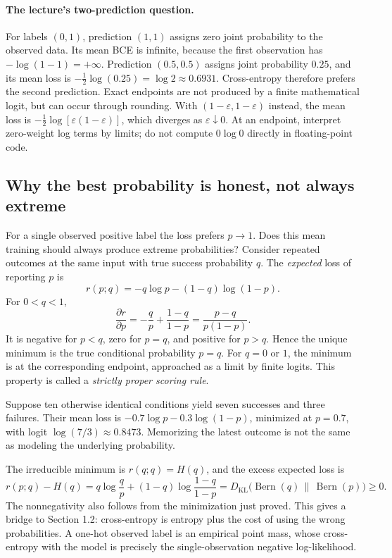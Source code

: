 \paragraph{The lecture's two-prediction question.}
For labels $(0,1)$, prediction $(1,1)$ assigns zero joint probability to the
observed data. Its mean BCE is infinite, because the first observation has
$-\log(1-1)=+\infty$. Prediction $(0.5,0.5)$ assigns joint probability $0.25$,
and its mean loss is $-\tfrac12\log(0.25)=\log2\approx0.6931$.
Cross-entropy therefore prefers the second prediction. Exact endpoints are not
produced by a finite mathematical logit, but can occur through rounding. With
$(1-\varepsilon,1-\varepsilon)$ instead, the mean loss is
$-\tfrac12\log[\varepsilon(1-\varepsilon)]$, which diverges as
$\varepsilon\downarrow0$. At an endpoint, interpret zero-weight log terms by
limits; do not compute $0\log0$ directly in floating-point code.

\subsection{Why the best probability is honest, not always extreme}
For a single observed positive label the loss prefers $p\to1$. Does this mean
training should always produce extreme probabilities? Consider repeated outcomes
at the same input with true success probability $q$. The \emph{expected} loss of
reporting $p$ is
\[
r(p;q)=-q\log p-(1-q)\log(1-p).
\]
For $0<q<1$,
\[
\frac{\partial r}{\partial p}
=-\frac{q}{p}+\frac{1-q}{1-p}
=\frac{p-q}{p(1-p)}.
\]
It is negative for $p<q$, zero for $p=q$, and positive for $p>q$. Hence the unique
minimum is the true conditional probability $p=q$. For $q=0$ or $1$, the minimum
is at the corresponding endpoint, approached as a limit by finite logits.
This property is called a \emph{strictly proper scoring rule}.

Suppose ten otherwise identical conditions yield seven successes and three
failures. Their mean loss is $-0.7\log p-0.3\log(1-p)$, minimized at $p=0.7$,
with logit $\log(7/3)\approx0.8473$. Memorizing the latest outcome is not the same
as modeling the underlying probability.

The irreducible minimum is
$r(q;q)=H(q)$, and the excess expected loss is
\[
r(p;q)-H(q)
=q\log\frac{q}{p}+(1-q)\log\frac{1-q}{1-p}
=D_{\mathrm{KL}}\bigl(\operatorname{Bern}(q)\,\|\,
\operatorname{Bern}(p)\bigr)\geq0.
\]
The nonnegativity also follows from the minimization just proved. This gives a
bridge to Section 1.2: cross-entropy is entropy plus the cost of using the wrong
probabilities. A one-hot observed label is an empirical point mass, whose
cross-entropy with the model is precisely the single-observation negative
log-likelihood.

